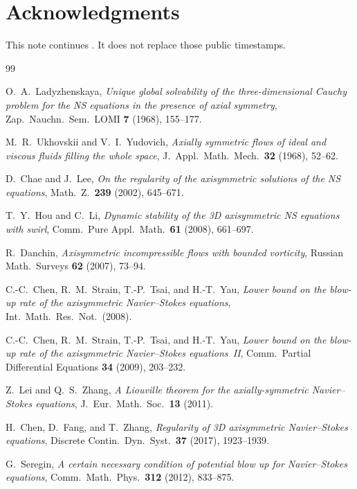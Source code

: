 \documentclass[11pt]{article}
\theoremstyle{definition}
\begin{document}
\section*{Acknowledgments}
This note continues \cite{SimonsPhi2026,SimonsPhiShort2026}.
It does not replace those public timestamps.

\begin{thebibliography}{99}

O.~A.~Ladyzhenskaya,
\textit{Unique global solvability of the three-dimensional Cauchy problem
for the NS equations in the presence of axial symmetry},
Zap.\ Nauchn.\ Sem.\ LOMI \textbf{7} (1968), 155--177.

M.~R.~Ukhovskii and V.~I.~Yudovich,
\textit{Axially symmetric flows of ideal and viscous fluids filling the
whole space}, J.\ Appl.\ Math.\ Mech.\ \textbf{32} (1968), 52--62.

D.~Chae and J.~Lee,
\textit{On the regularity of the axisymmetric solutions of the NS equations},
Math.\ Z.\ \textbf{239} (2002), 645--671.

T.~Y.~Hou and C.~Li,
\textit{Dynamic stability of the 3D axisymmetric NS equations with swirl},
Comm.\ Pure Appl.\ Math.\ \textbf{61} (2008), 661--697.

R.~Danchin,
\textit{Axisymmetric incompressible flows with bounded vorticity},
Russian Math.\ Surveys \textbf{62} (2007), 73--94.

C.-C.~Chen, R.~M.~Strain, T.-P.~Tsai, and H.-T.~Yau,
\textit{Lower bound on the blow-up rate of the axisymmetric Navier--Stokes equations},
Int.\ Math.\ Res.\ Not.\ (2008).

C.-C.~Chen, R.~M.~Strain, T.-P.~Tsai, and H.-T.~Yau,
\textit{Lower bound on the blow-up rate of the axisymmetric Navier--Stokes equations~II},
Comm.\ Partial Differential Equations \textbf{34} (2009), 203--232.

Z.~Lei and Q.~S.~Zhang,
\textit{A Liouville theorem for the axially-symmetric Navier--Stokes equations},
J.\ Eur.\ Math.\ Soc.\ \textbf{13} (2011).

H.~Chen, D.~Fang, and T.~Zhang,
\textit{Regularity of 3D axisymmetric Navier--Stokes equations},
Discrete Contin.\ Dyn.\ Syst.\ \textbf{37} (2017), 1923--1939.

G.~Seregin,
\textit{A certain necessary condition of potential blow up for Navier--Stokes equations},
Comm.\ Math.\ Phys.\ \textbf{312} (2012), 833--875.


\end{thebibliography}
\end{document}
